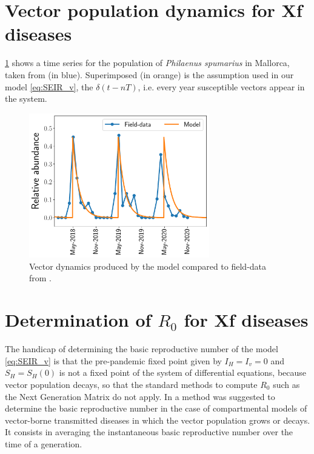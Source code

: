 \section{Vector population dynamics for Xf diseases}\label{app:vector_dynamics}

\cref{fig:vector_dynamics} shows a time series for the population of
\textit{Philaenus spumarius} in Mallorca, taken from \cite{Lopez2021} (in
blue). Superimposed (in orange) is the assumption used in our model
\cref{eq:SEIR_v}, the $\delta(t-nT)$, i.e. every year susceptible vectors
appear in the system.

\begin{figure}
    \centering
    \includegraphics[width=0.7\textwidth]{Figures/Vector_dynamics.pdf}
    \caption[Vector dynamics produced by the model compared to
        field-data]{Vector dynamics produced by the model compared to field-data
        from \cite{Lopez2021}.}
    \label{fig:vector_dynamics}
\end{figure}

\section{Determination of $R_0$ for Xf diseases}\label{app:R0}

The handicap of determining the basic reproductive number of the model
\cref{eq:SEIR_v} is that the pre-pandemic fixed point given by $I_H=I_v=0$ and
$S_H=S_H(0)$ is not a fixed point of the system of differential equations,
because vector population decays, so that the standard methods to compute $R_0$
such as the Next Generation Matrix \cite{Diekmann2010, GimenezRomero2022_PRE}
do not
apply. In \cite{GimenezRomero2022_PRE} a method was suggested to determine
the basic
reproductive number in the case of compartmental models of vector-borne
transmitted diseases in which the vector population grows or decays. It
consists in averaging the instantaneous basic reproductive number over the time
of a generation.

